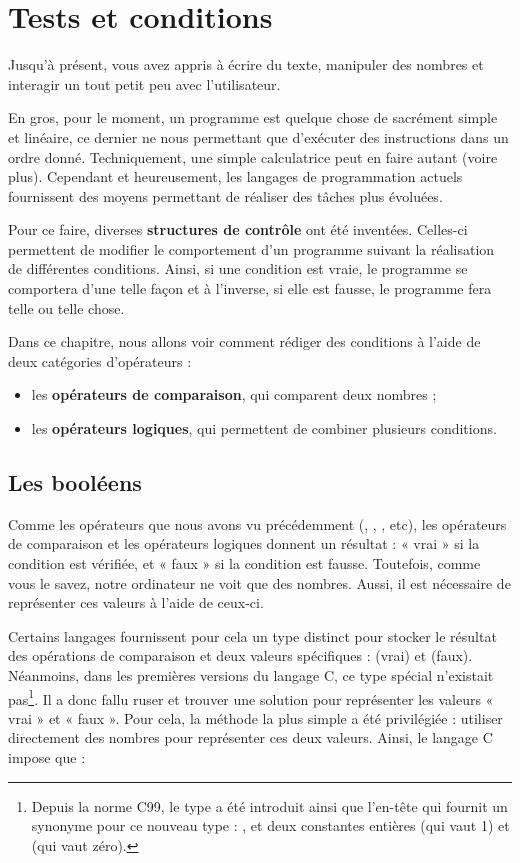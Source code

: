 \chapter{Tests et conditions}
\label{tests-et-conditions}

Jusqu'à présent, vous avez appris à écrire du texte, manipuler des nombres
et interagir un tout petit peu avec l'utilisateur.

En gros, pour le moment, un programme est quelque chose de sacrément
simple et linéaire, ce dernier ne nous permettant que d'exécuter des
instructions dans un ordre donné. Techniquement, une simple calculatrice
peut en faire autant (voire plus). Cependant et heureusement, les
langages de programmation actuels fournissent des moyens permettant de
réaliser des tâches plus évoluées.

Pour ce faire, diverses \textbf{structures de contrôle} ont été
inventées. Celles-ci permettent de modifier le comportement d'un
programme suivant la réalisation de différentes conditions. Ainsi, si
une condition est vraie, le programme se comportera d'une telle façon et
à l'inverse, si elle est fausse, le programme fera telle ou telle chose.

Dans ce chapitre, nous allons voir comment rédiger des conditions à
l'aide de deux catégories d'opérateurs :

\begin{itemize}

\item
  les \textbf{opérateurs de comparaison}, qui comparent deux nombres ;
\item
  les \textbf{opérateurs logiques}, qui permettent de combiner plusieurs
  conditions.
\end{itemize}
  
\section{Les booléens}

Comme les opérateurs que nous avons vu
précédemment (\mybox{+}, \mybox{-}, \mybox{*}, etc), les opérateurs
de comparaison et les opérateurs logiques donnent un résultat : « vrai »
si la condition est vérifiée, et « faux » si la condition est fausse.
Toutefois, comme vous le savez, notre ordinateur ne voit que des
nombres. Aussi, il est nécessaire de représenter ces valeurs à l'aide de
ceux-ci.

Certains langages fournissent pour cela un type distinct pour stocker le
résultat des opérations de comparaison et deux valeurs spécifiques :
 (vrai) et  (faux). Néanmoins, dans les
premières versions du langage C, ce type spécial n'existait
pas\footnote{\footnotesize{Depuis la norme C99, le type  a été
  introduit ainsi que l'en-tête  qui fournit un synonyme
  pour ce nouveau type : , et deux constantes entières
   (qui vaut 1) et  (qui vaut zéro).}}. Il a donc fallu
ruser et trouver une solution pour représenter les valeurs « vrai » et «
faux ». Pour cela, la méthode la plus simple a été privilégiée :
utiliser directement des nombres pour représenter ces deux valeurs.
Ainsi, le langage C impose que :

